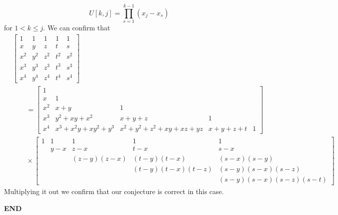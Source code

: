 \documentclass[12pt,a4paper]{article}
\begin{document}
\[
U[k,j] = \ensuremath{\prod}_{s = 1}^{k-1} (x_j-x_s)
\]
for $1 < k \ensuremath{\leq} j$. We can confirm that
\begin{align*}
&\begin{bmatrix}
1 & 1 & 1 & 1 & 1 \\
x & y & z & t & s\\
x^2 & y^2 & z^2 & t^2 & s^2 \\
x^3 & y^3 & z^3 & t^3 & s^3 \\
x^4 & y^4 & z^4 & t^4 & s^4
\end{bmatrix} \\
&\qquad =
\begin{bmatrix}
1 &  \\
x & 1 \\
x^2 & x+y  & 1 \\
x^3 &y^2 + xy + x^2  & x+ y + z & 1 \\
x^4 & x^3 + x^2 y + x y^2 + y^3 & x^2 + y^2 + z^2 + xy + xz + yz  & x + y + z + t & 1
\end{bmatrix} \\
&\qquad \ensuremath{\times}
\begin{bmatrix}
1 & 1 & 1 & 1 & 1\\
 & y-x & z-x & t-x & s-x  \\
 &  & (z-y)(z-x) & (t-y)(t-x) & (s-x) (s-y) \\
 &  &  & (t-y)(t-x)(t-z) &   (s-y)(s-x)(s-z)  \\
 &  &  &  &   (s-y)(s-x)(s-z)(s-t)
\end{bmatrix}
\end{align*}
Multiplying it out we confirm that our conjecture is correct in this case.

\textbf{END}
\end{document}
